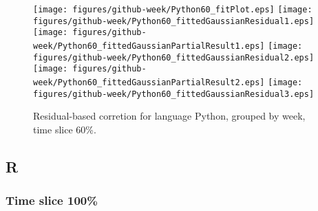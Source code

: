 \begin{figure}[hb]
\centering
{}
{\texttt{[image: figures/github-week/Python60\_fitPlot.eps]}}
{\texttt{[image: figures/github-week/Python60\_fittedGaussianResidual1.eps]}}
{\texttt{[image: figures/github-week/Python60\_fittedGaussianPartialResult1.eps]}}
{\texttt{[image: figures/github-week/Python60\_fittedGaussianResidual2.eps]}}
{\texttt{[image: figures/github-week/Python60\_fittedGaussianPartialResult2.eps]}}
{\texttt{[image: figures/github-week/Python60\_fittedGaussianResidual3.eps]}}
\caption{Residual-based corretion for language Python, grouped by week, time slice 60\%.}
\end{figure}


\clearpage 
\newpage 


\subsection{R}

\FloatBarrier

\subsubsection{Time slice 100\%}

